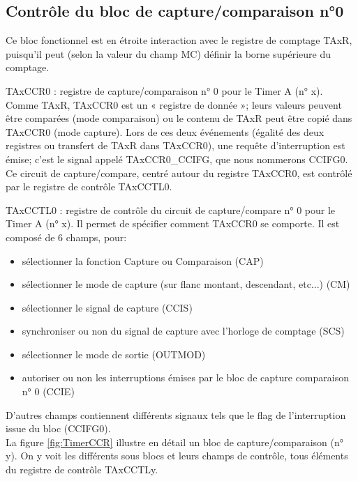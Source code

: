 \subsection{Contrôle du bloc de capture/comparaison n°0}
Ce bloc fonctionnel est en étroite interaction avec le registre de comptage TAxR, puisqu'il peut (selon la valeur du champ MC) définir la borne supérieure du comptage.

TAxCCR0 : registre de capture/comparaison n° 0 pour le Timer A (n° x). Comme TAxR, TAxCCR0 est un « registre de donnée »; leurs valeurs peuvent être comparées (mode comparaison) ou le contenu de TAxR peut être copié dans TAxCCR0 (mode capture).
Lors de ces deux événements (égalité des deux registres ou transfert de TAxR dans TAxCCR0), une requête d'interruption est émise; c'est le signal appelé TAxCCR0\_CCIFG, que nous nommerons CCIFG0.
Ce circuit de capture/compare, centré autour du registre TAxCCR0, est contrôlé par le registre de contrôle TAxCCTL0.

TAxCCTL0 : registre de contrôle du circuit de capture/compare n° 0 pour le Timer A (n° x). Il permet de spécifier comment TAxCCR0 se comporte. Il est composé de 6 champs, pour:
\begin{itemize}[label=\textbullet,font=\small]
\item sélectionner la fonction Capture ou Comparaison (CAP)
\item sélectionner le mode de capture (sur flanc montant, descendant, etc...) (CM)
\item sélectionner le signal de capture (CCIS)
\item synchroniser ou non du signal de capture avec l'horloge de comptage (SCS)
\item sélectionner le mode de sortie (OUTMOD)
\item autoriser ou non les interruptions émises par le bloc de capture comparaison n° 0 (CCIE)
\end{itemize}

D'autres champs contiennent différents signaux tels que le flag de l'interruption issue du bloc (CCIFG0).
\\
La figure \ref{fig:TimerCCR} illustre en détail un bloc de capture/comparaison (n° y). On y voit les différents sous blocs et leurs champs de contrôle, tous éléments du registre de contrôle TAxCCTLy.

